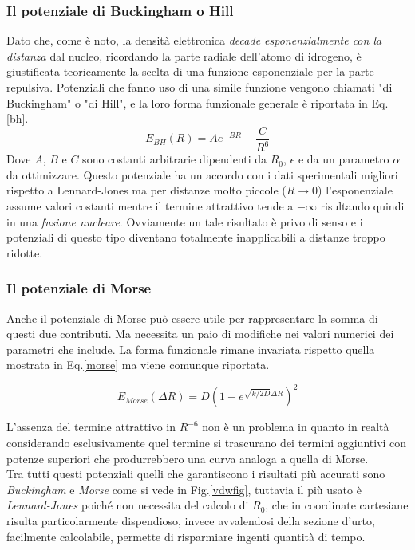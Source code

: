 \documentclass[oneside]{amsbook}
\numberwithin{section}{chapter}
\numberwithin{equation}{section}
\numberwithin{figure}{section}
\begin{document}
\subsubsection{Il potenziale di Buckingham o Hill}
Dato che, come è noto, la densità elettronica \emph{decade esponenzialmente con la distanza} dal nucleo, ricordando la parte radiale dell'atomo di idrogeno, è giustificata teoricamente la scelta di una funzione esponenziale per la parte repulsiva. Potenziali che fanno uso di una simile funzione vengono chiamati "di Buckingham" o "di Hill", e la loro forma funzionale generale è riportata in Eq. \ref{bh}.
\begin{equation}
\label{bh}
E_{BH}(R)=A e^{-BR}-\frac{C}{R^6}
\end{equation}
Dove $A$, $ B$ e $ C$ sono costanti arbitrarie dipendenti da $R_0$, $\epsilon$ e da 
un parametro $\alpha$ da ottimizzare.
Questo potenziale ha un accordo con i dati sperimentali migliori rispetto a Lennard-Jones ma per distanze molto piccole ($R\rightarrow0$) l'esponenziale assume valori costanti mentre il termine attrattivo tende a $-\infty$ risultando quindi in una \emph{fusione nucleare}. Ovviamente un tale risultato è privo di senso e i potenziali di questo tipo diventano totalmente inapplicabili a distanze troppo ridotte.\\

\subsubsection{Il potenziale di Morse}
Anche il potenziale di Morse può essere utile per rappresentare la somma di questi due contributi. Ma necessita un paio di modifiche nei valori numerici dei parametri che include.
La forma funzionale rimane invariata rispetto quella mostrata in Eq.\ref{morse} ma viene comunque riportata.

\begin{equation}
\label{morse2}
E_{Morse}(\Delta R)= D(1-e^{\sqrt{k/2D}\Delta R})^2
\end{equation}

L'assenza del termine attrattivo in $R^{-6}$ non è un problema in quanto in realtà considerando esclusivamente quel termine si trascurano dei termini aggiuntivi con potenze superiori che produrrebbero una curva analoga a quella di Morse.\\
Tra tutti questi potenziali quelli che  garantiscono i risultati più accurati sono \emph{Buckingham} e \emph{Morse} come si vede in Fig.\ref{vdwfig}, tuttavia il più usato è \emph{Lennard-Jones} poiché non necessita del calcolo di $R_0$, che in coordinate cartesiane risulta particolarmente dispendioso, invece avvalendosi della sezione d'urto, facilmente calcolabile, permette di risparmiare ingenti quantità di tempo.
\end{document}
